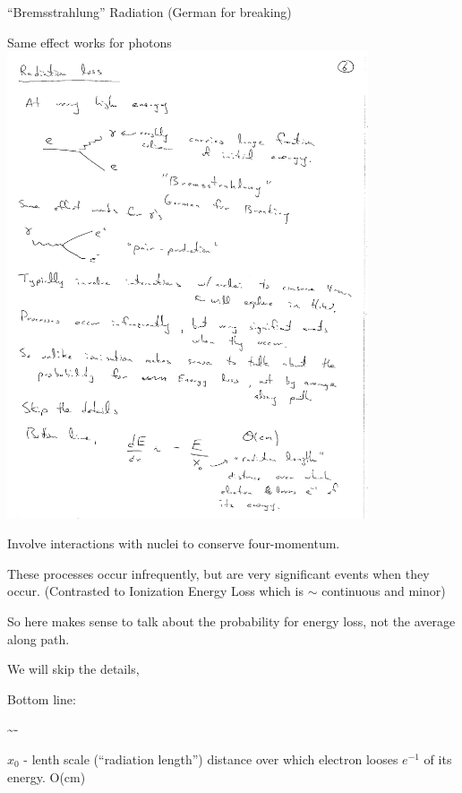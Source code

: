 {``Bremsstrahlung'' Radiation (German for breaking)


Same effect works for photons
\bc
\includegraphics[width=0.8\textwidth]{./PairProduction.pdf}
\ec

Involve interactions with nuclei to conserve four-momentum.


These processes occur infrequently, but are very significant events when they occur.
(Contrasted to Ionization Energy Loss which is $\sim$ continuous and minor)

So here makes sense to talk about the probability for energy loss, not the average along path.

We will skip the details, 

Bottom line:

\be
{} \sim - 
\ee

$x_0$ - lenth scale (``radiation length'') distance over which electron looses $e^{-1}$ of its energy. O(cm)


}
